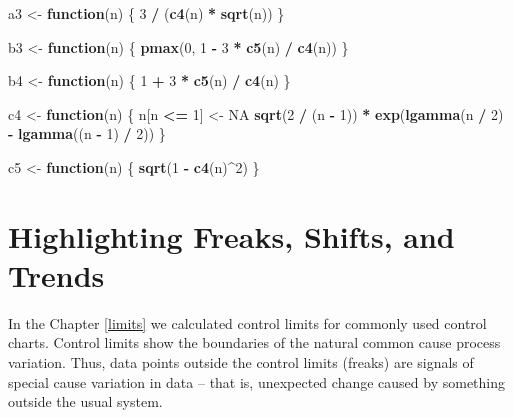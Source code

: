 \documentclass[
]{book}
\newenvironment{Shaded}{\begin{snugshade}}{\end{snugshade}}
\newcommand{\ConstantTok}[1]{\textcolor[rgb]{0.56,0.35,0.01}{#1}}
\newcommand{\ControlFlowTok}[1]{\textcolor[rgb]{0.13,0.29,0.53}{\textbf{#1}}}
\newcommand{\DecValTok}[1]{\textcolor[rgb]{0.00,0.00,0.81}{#1}}
\newcommand{\FunctionTok}[1]{\textcolor[rgb]{0.13,0.29,0.53}{\textbf{#1}}}
\newcommand{\NormalTok}[1]{#1}
\newcommand{\OtherTok}[1]{\textcolor[rgb]{0.56,0.35,0.01}{#1}}
\newcommand{\SpecialCharTok}[1]{\textcolor[rgb]{0.81,0.36,0.00}{\textbf{#1}}}
\begin{document}
\begin{Shaded}
\begin{Highlighting}[]
\NormalTok{a3 }\OtherTok{\textless{}{-}} \ControlFlowTok{function}\NormalTok{(n) \{}
  \DecValTok{3} \SpecialCharTok{/}\NormalTok{ (}\FunctionTok{c4}\NormalTok{(n) }\SpecialCharTok{*} \FunctionTok{sqrt}\NormalTok{(n))}
\NormalTok{\}}

\NormalTok{b3 }\OtherTok{\textless{}{-}} \ControlFlowTok{function}\NormalTok{(n) \{}
  \FunctionTok{pmax}\NormalTok{(}\DecValTok{0}\NormalTok{, }\DecValTok{1} \SpecialCharTok{{-}} \DecValTok{3} \SpecialCharTok{*} \FunctionTok{c5}\NormalTok{(n) }\SpecialCharTok{/} \FunctionTok{c4}\NormalTok{(n))}
\NormalTok{\}}

\NormalTok{b4 }\OtherTok{\textless{}{-}} \ControlFlowTok{function}\NormalTok{(n) \{}
  \DecValTok{1} \SpecialCharTok{+} \DecValTok{3} \SpecialCharTok{*} \FunctionTok{c5}\NormalTok{(n) }\SpecialCharTok{/} \FunctionTok{c4}\NormalTok{(n)}
\NormalTok{\}}

\NormalTok{c4 }\OtherTok{\textless{}{-}} \ControlFlowTok{function}\NormalTok{(n) \{}
\NormalTok{  n[n }\SpecialCharTok{\textless{}=} \DecValTok{1}\NormalTok{] }\OtherTok{\textless{}{-}} \ConstantTok{NA}
  \FunctionTok{sqrt}\NormalTok{(}\DecValTok{2} \SpecialCharTok{/}\NormalTok{ (n }\SpecialCharTok{{-}} \DecValTok{1}\NormalTok{)) }\SpecialCharTok{*} \FunctionTok{exp}\NormalTok{(}\FunctionTok{lgamma}\NormalTok{(n }\SpecialCharTok{/} \DecValTok{2}\NormalTok{) }\SpecialCharTok{{-}} \FunctionTok{lgamma}\NormalTok{((n }\SpecialCharTok{{-}} \DecValTok{1}\NormalTok{) }\SpecialCharTok{/} \DecValTok{2}\NormalTok{))}
\NormalTok{\}}

\NormalTok{c5 }\OtherTok{\textless{}{-}} \ControlFlowTok{function}\NormalTok{(n) \{}
  \FunctionTok{sqrt}\NormalTok{(}\DecValTok{1} \SpecialCharTok{{-}} \FunctionTok{c4}\NormalTok{(n)}\SpecialCharTok{\^{}}\DecValTok{2}\NormalTok{)}
\NormalTok{\}}
\end{Highlighting}
\end{Shaded}

\chapter{Highlighting Freaks, Shifts, and Trends}\label{highlighting}

In the Chapter \ref{limits} we calculated control limits for commonly used control charts. Control limits show the boundaries of the natural common cause process variation. Thus, data points outside the control limits (freaks) are signals of special cause variation in data -- that is, unexpected change caused by something outside the usual system.
\end{document}

